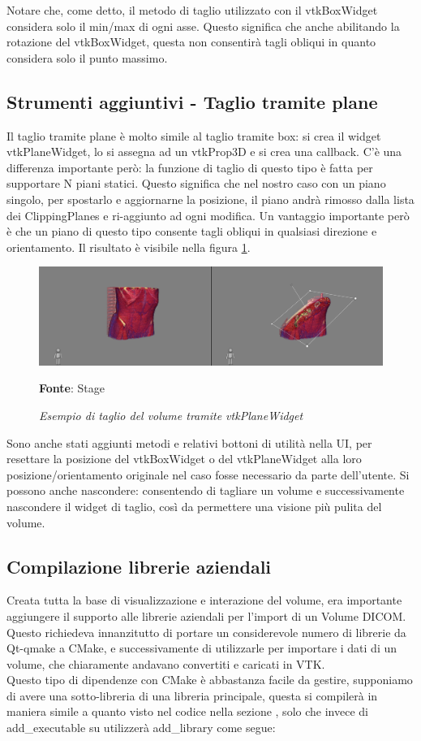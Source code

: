 Notare che, come detto, il metodo di taglio utilizzato con il vtkBoxWidget considera solo il min/max di ogni asse. Questo significa che anche abilitando la rotazione del vtkBoxWidget, questa non consentirà tagli obliqui in quanto considera solo il punto massimo. 

\subsection{Strumenti aggiuntivi - Taglio tramite plane}
Il taglio tramite plane è molto simile al taglio tramite box: si crea il widget vtkPlaneWidget, lo si assegna ad un vtkProp3D e si crea una callback. C'è una differenza importante però: la funzione di taglio di questo tipo è fatta per supportare N piani statici. Questo significa che nel nostro caso con un piano singolo, per spostarlo e aggiornarne la posizione, il piano andrà rimosso dalla lista dei ClippingPlanes e ri-aggiunto ad ogni modifica. Un vantaggio importante però è che un piano di questo tipo consente tagli obliqui in qualsiasi direzione e orientamento. Il risultato è visibile nella figura \ref{fig: Taglio Plane}.

\begin{figure}[h]
    \centering
    \includegraphics[width=1\textwidth]{immagini/svolgimento/planecrop.png}
    \caption{\textit{Esempio di taglio del volume tramite vtkPlaneWidget}}
    \textbf{Fonte}: Stage
    \label{fig: Taglio Plane}
\end{figure}

Sono anche stati aggiunti metodi e relativi bottoni di utilità nella UI, per resettare la posizione del vtkBoxWidget o del vtkPlaneWidget alla loro posizione/orientamento originale nel caso fosse necessario da parte dell'utente. Si possono anche nascondere: consentendo di tagliare un volume e successivamente nascondere il widget di taglio, così da permettere una visione più pulita del volume.

\subsection{Compilazione librerie aziendali}
Creata tutta la base di visualizzazione e interazione del volume, era importante aggiungere il supporto alle librerie aziendali per l'import di un Volume DICOM. Questo richiedeva innanzitutto di portare un considerevole numero di librerie da Qt-qmake a CMake, e successivamente di utilizzarle per importare i dati di un volume, che chiaramente andavano convertiti e caricati in VTK.
\\
Questo tipo di dipendenze con CMake è abbastanza facile da gestire, supponiamo di avere una sotto-libreria di una libreria principale, questa si compilerà in maniera simile a quanto visto nel codice nella sezione , solo che invece di add\_executable su utilizzerà add\_library come segue:

